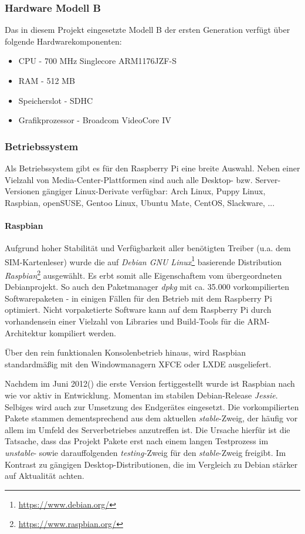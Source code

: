 \subsubsection{Hardware Modell B}
Das in diesem Projekt eingesetzte Modell B der ersten Generation verfügt über folgende Hardwarekomponenten:
\begin{itemize}
\item CPU - 700 MHz Singlecore ARM1176JZF-S
\item RAM - 512 MB
\item Speicherslot - SDHC
\item Grafikprozessor - Broadcom VideoCore IV
\end{itemize}

\subsubsection{Betriebssystem}
Als Betriebssystem gibt es für den Raspberry Pi eine breite Auswahl.
Neben einer Vielzahl von Media-Center-Plattformen sind auch alle
Desktop- bzw. Server-Versionen gängiger Linux-Derivate verfügbar:
Arch Linux, Puppy Linux, Raspbian, openSUSE, Gentoo Linux, Ubuntu Mate,
CentOS, Slackware, ...

\paragraph{Raspbian}
Aufgrund hoher Stabilität und Verfügbarkeit aller benötigten Treiber
(u.a. dem SIM-Kartenleser) wurde die auf \textit{Debian GNU Linux}\footnote{\url{https://www.debian.org/}}
basierende Distribution \textit{Raspbian}\footnote{\url{https://www.raspbian.org/}} ausgewählt.
Es erbt somit alle Eigenschaftem vom übergeordneten Debianprojekt.
So auch den Paketmanager \textit{dpkg} mit ca. 35.000 vorkompilierten
Softwarepaketen - in einigen Fällen für den Betrieb mit dem
Raspberry Pi optimiert. Nicht vorpaketierte Software kann auf dem Raspberry
Pi durch vorhandensein einer Vielzahl von Libraries und Build-Tools
für die ARM-Architektur kompiliert werden.

Über den rein funktionalen Konsolenbetrieb hinaus, wird Raspbian standardmäßig mit den
Windowmanagern XFCE oder LXDE ausgeliefert.

Nachdem im Juni 2012(\cite{raspbianweb}) die erste
Version fertiggestellt wurde ist Raspbian nach wie vor aktiv
in Entwicklung. Momentan im stabilen Debian-Release \textit{Jessie}.
Selbiges wird auch zur Umsetzung des Endgerätes eingesetzt.
Die vorkompilierten Pakete stammen dementsprechend aus dem aktuellen
\textit{stable}-Zweig, der häufig vor allem im Umfeld des Serverbetriebes
anzutreffen ist. Die Ursache hierfür ist die Tatsache, dass das
Projekt Pakete erst nach einem langen Testprozess im \textit{unstable}-
sowie darauffolgenden \textit{testing-}Zweig für den \textit{stable}-Zweig
freigibt. Im Kontrast zu gängigen Desktop-Distributionen, die
im Vergleich zu Debian stärker auf Aktualität achten.

